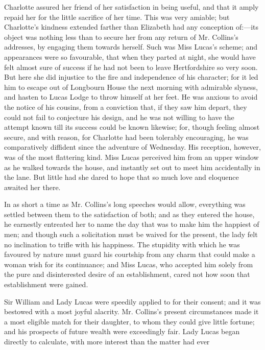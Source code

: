 \documentclass[10pt]{book}
\begin{document}
   Charlotte assured her friend of her satisfaction in being useful, and
that it amply repaid her for the little sacrifice of her time. This was
very amiable; but Charlotte’s kindness extended farther than Elizabeth
had any conception of:—its object was nothing less than to secure her
from any return of Mr. Collins’s addresses, by engaging them towards
herself. Such was Miss Lucas’s scheme; and appearances were so
favourable, that when they parted at night, she would have felt almost
sure of success if he had not been to leave Hertfordshire so very soon.
But here she did injustice to the fire and independence of his
character; for it led him to escape out of Longbourn House the next
morning with
   admirable slyness, and hasten to Lucas Lodge to throw
himself at her feet. He was anxious to avoid the notice of his cousins,
from a conviction that, if they saw him depart, they could not fail to
conjecture his design, and he was not willing to have the attempt known
till its success could be known likewise; for, though feeling almost
secure, and with reason, for Charlotte had been tolerably encouraging,
he was comparatively diffident since the adventure of Wednesday. His
reception, however, was of the most flattering kind. Miss Lucas
perceived him from an upper window as he walked towards the house, and
instantly set out to meet him accidentally in the lane. But little had
she dared to hope that so much love and eloquence awaited her there.
  

   In as short a time as Mr. Collins’s long speeches would allow,
everything was settled between them to the satisfaction of both; and as
they entered the house, he earnestly entreated her to name the day that
was to make him the happiest of men; and though such a solicitation must
be waived for the present, the lady felt no inclination to trifle with
his happiness. The stupidity with which he was favoured by nature must
guard his courtship from any charm that could make a woman wish for its
continuance; and Miss Lucas, who accepted him solely from the pure and
disinterested desire of an establishment, cared not how soon that
establishment were gained.
  

   Sir William and Lady Lucas were speedily applied to for their consent;
and it was bestowed with a most joyful alacrity. Mr. Collins’s present
circumstances made it a most eligible match for their daughter, to whom
they could give little fortune; and his prospects of future wealth were
exceedingly fair. Lady Lucas began directly to calculate, with more
interest than the matter had ever
  
\end{document}
